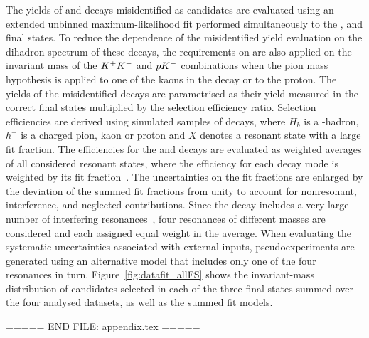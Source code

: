 The yields of \bskkg and \lbpkg decays misidentified as \kpig candidates are evaluated using an extended unbinned maximum-likelihood fit performed simultaneously to the \kpig, \kkg and \pkg final states.
To reduce the dependence of the misidentified yield evaluation on the dihadron spectrum of these decays, the requirements on \mkpi are also applied on the invariant mass of the ${{K}^+}{{K}^-}$ and $p{{K}^-}$ combinations when the pion mass hypothesis is applied to one of the kaons in the \bskkg decay or to the proton.
The yields of the misidentified decays are parametrised as their yield measured in the correct final states multiplied by the selection efficiency ratio.
Selection efficiencies are derived using simulated samples of \mbox{} decays, where $H_b$ is a \bquark-hadron, $h^+$ is a charged pion, kaon or proton and $X$ denotes a resonant state with a large fit fraction.
The efficiencies for the \mbox{} and \mbox{} decays are evaluated as weighted averages of all considered resonant states, where the efficiency for each decay mode is weighted by its fit fraction~\cite{PDG2024,LHCb-PAPER-2024-002}.
The uncertainties on the fit fractions are enlarged by the deviation of the summed fit fractions from unity to account for nonresonant, interference, and neglected contributions.
Since the \mbox{} decay includes a very large number of interfering resonances~\cite{LHCb-PAPER-2023-036}, four resonances of different masses are considered and each assigned equal weight in the average.
When evaluating the systematic uncertainties associated with external inputs, pseudoexperiments are generated using an alternative model that includes only one of the four resonances in turn.
Figure~\ref{fig:datafit_allFS} shows the invariant-mass distribution of candidates selected in each of the three final states summed over the four analysed datasets, as well as the summed fit models.

\newpage
===== END FILE: appendix.tex =====


